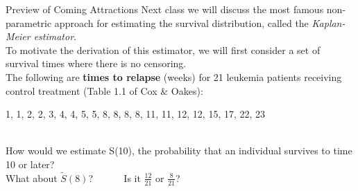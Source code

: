 \documentclass[envcountsect, 10pt, portrait, palatino]{beamer}
\begin{document}
\begin{frame}{Preview of Coming Attractions}
Next class we will discuss the most famous non-parametric
approach for  estimating the survival distribution,
called the {\em Kaplan-Meier estimator}.
\\[2ex]
To motivate the derivation of this estimator, we will
first consider a set of survival times where there is
no censoring.
\\[2ex]
The following are {\bf times to relapse} (weeks) for 21 leukemia patients
receiving control treatment (Table 1.1 of Cox \& Oakes): 
\\[1.5ex]
\centerline{1, 1, 2, 2, 3, 4, 4, 5, 5, 8, 8, 8, 8, 11, 11, 12, 12, 15,
17, 22, 23}
~\\[2ex]
How would we estimate S(10), the probability that
an individual survives to time 10 or later?
\\[2ex]
What about $\tilde{S}(8)$?  ~~~~~ Is it $\frac{12}{21}$ or $\frac{8}{21}$?
\end{frame}
\end{document}
